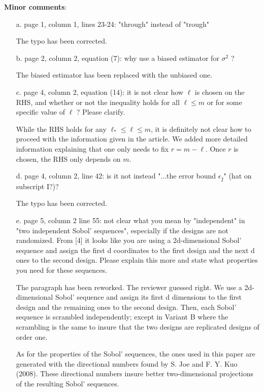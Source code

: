 \documentclass[10pt,a4paper]{article}
\newcommand{\answer}[1]{{\color{blue} #1 }}
\begin{document}
\textbf{Minor comments}:
\begin{itemize}
\item[a.] page 1, column 1, lines 23-24: "through" instead of "trough"

{\color{blue} The typo has been corrected.}
\item[b.] page 2, column 2, equation (7): why use a biased estimator for $\sigma^2$ ?

{\color{blue} The biased estimator has been replaced with the unbiased one.}
\item[c.] page 4, column 2, equation (14): it is not clear how $\ell$ is chosen on the RHS, and whether or not the inequality holds for all $\ell \leq m$ or for some specific value of $\ell$ ? Please clarify.

\answer{While the RHS holds for any $\ell_*\leq\ell\leq m$, it is definitely not clear how to proceed with the information given in the article. We added more detailed information explaining that one only needs to fix $r=m-\ell$. Once $r$ is chosen, the RHS only depends on $m$.}

\item[d.] page 4, column 2, line 42: is it not instead "...the error bound $\epsilon_{\hat{I}}$" (hat on subscript I?)?

{\color{blue} The typo has been corrected.}
\item[e.] page 5, column 2 line 55: not clear what you mean by "independent" in "two independent Sobol' sequences", especially if the designs are not randomized. From [4] it looks like you are using a 2d-dimensional Sobol' sequence and assign the first d coordinates to the first design and the next d ones to the second design. Please explain this more and state what properties you need for these sequences.

{\color{blue} The paragraph has been reworked. The reviewer guessed right. We use a 2d-dimensional Sobol' sequence and assign its first d dimensions to the first design and the remaining ones to the second design. Then, each Sobol' sequence is scrambled independently; except in Variant B where the scrambling is the same to insure that the two designs are replicated designs of order one.

As for the properties of the Sobol' sequences, the ones used in this paper are generated with the directional numbers found by S. Joe and F. Y. Kuo (2008). These directional numbers insure better two-dimensional projections of the resulting Sobol' sequences.}


\end{itemize}
\end{document}

